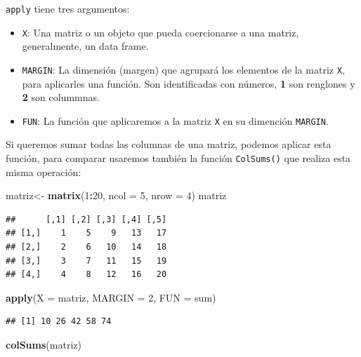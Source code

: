 \documentclass[
]{book}
\newenvironment{Shaded}{\begin{snugshade}}{\end{snugshade}}
\newcommand{\AttributeTok}[1]{\textcolor[rgb]{0.13,0.29,0.53}{#1}}
\newcommand{\DecValTok}[1]{\textcolor[rgb]{0.00,0.00,0.81}{#1}}
\newcommand{\FunctionTok}[1]{\textcolor[rgb]{0.13,0.29,0.53}{\textbf{#1}}}
\newcommand{\NormalTok}[1]{#1}
\newcommand{\OtherTok}[1]{\textcolor[rgb]{0.56,0.35,0.01}{#1}}
\newcommand{\SpecialCharTok}[1]{\textcolor[rgb]{0.81,0.36,0.00}{\textbf{#1}}}
\begin{document}
\texttt{apply} tiene tres argumentos:

\begin{itemize}
\item
  \texttt{X}: Una matriz o un objeto que pueda coercionarse a una matriz, generalmente, un data frame.
\item
  \texttt{MARGIN}: La dimensión (margen) que agrupará los elementos de la matriz \texttt{X}, para aplicarles una función.
  Son identificadas con números, \textbf{1} son renglones y \textbf{2} son colummnas.
\item
  \texttt{FUN}: La función que aplicaremos a la matriz \texttt{X} en su dimención \texttt{MARGIN}.
\end{itemize}

Si queremos sumar todas las columnas de una matriz, podemos aplicar esta función, para comparar usaremos también la función \texttt{ColSums()} que realiza esta misma operación:

\begin{Shaded}
\begin{Highlighting}[]
\NormalTok{matriz}\OtherTok{\textless{}{-}} \FunctionTok{matrix}\NormalTok{(}\DecValTok{1}\SpecialCharTok{:}\DecValTok{20}\NormalTok{, }\AttributeTok{ncol =} \DecValTok{5}\NormalTok{, }\AttributeTok{nrow =} \DecValTok{4}\NormalTok{)}
\NormalTok{matriz}
\end{Highlighting}
\end{Shaded}

\begin{verbatim}
##      [,1] [,2] [,3] [,4] [,5]
## [1,]    1    5    9   13   17
## [2,]    2    6   10   14   18
## [3,]    3    7   11   15   19
## [4,]    4    8   12   16   20
\end{verbatim}

\begin{Shaded}
\begin{Highlighting}[]
\FunctionTok{apply}\NormalTok{(}\AttributeTok{X =}\NormalTok{ matriz, }\AttributeTok{MARGIN =} \DecValTok{2}\NormalTok{, }\AttributeTok{FUN =}\NormalTok{ sum)}
\end{Highlighting}
\end{Shaded}

\begin{verbatim}
## [1] 10 26 42 58 74
\end{verbatim}

\begin{Shaded}
\begin{Highlighting}[]
\FunctionTok{colSums}\NormalTok{(matriz)}
\end{Highlighting}
\end{Shaded}
\end{document}
